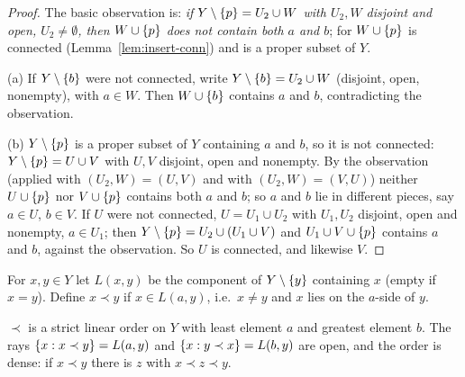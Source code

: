 \begin{proof}
The basic observation is: \emph{if $Y\setminus\left\{ p \right\}=U_2\cup W$ with $U_2,W$ disjoint and open,
$U_2\ne\emptyset$, then $W\cup\left\{ p \right\}$ does not contain both $a$ and $b$}; for $W\cup\left\{ p \right\}$ is
connected (Lemma~\ref{lem:insert-conn}) and is a proper subset of $Y$.

(a) If $Y\setminus\left\{ b \right\}$ were not connected, write $Y\setminus\left\{ b \right\}=U_2\cup W$ (disjoint, open,
nonempty), with $a\in W$. Then $W\cup\left\{ b \right\}$ contains $a$ and $b$, contradicting the observation.

(b) $Y\setminus\left\{ p \right\}$ is a proper subset of $Y$ containing $a$ and $b$, so it is not connected:
$Y\setminus\left\{ p \right\}=U\cup V$ with $U,V$ disjoint, open and nonempty. By the observation (applied with
$(U_2,W)=(U,V)$ and with $(U_2,W)=(V,U)$) neither $U\cup\left\{ p \right\}$ nor $V\cup\left\{ p \right\}$ contains both $a$
and $b$; so $a$ and $b$ lie in different pieces, say $a\in U$, $b\in V$. If $U$ were not connected,
$U=U_1\cup U_2$ with $U_1,U_2$ disjoint, open and nonempty, $a\in U_1$; then $Y\setminus\left\{ p \right\}=U_2\cup(U_1\cup V)$ and $U_1\cup V\cup\left\{ p \right\}$ contains $a$ and $b$, against the observation. So $U$
is connected, and likewise $V$.
\end{proof}


For $x,y\in Y$ let $L(x,y)$ be the component of $Y\setminus\left\{ y \right\}$ containing $x$ (empty if $x=y$).
Define $x\prec y$ if $x\in L(a,y)$, i.e.\ $x\ne y$ and $x$ lies on the $a$-side of $y$.

\begin{proposition}\label{prop:arc-order}
$\prec$ is a strict linear order on $Y$ with least element $a$ and greatest element $b$. The rays
$\left\{ x:x\prec y \right\}=L(a,y)$ and $\left\{ x:y\prec x \right\}=L(b,y)$ are open, and the order is dense: if $x\prec
y$ there is $z$ with $x\prec z\prec y$.
\end{proposition}

